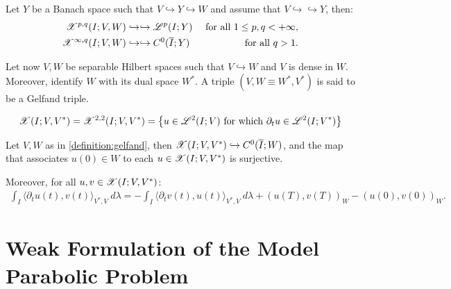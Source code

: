 \begin{theorem}
    Let $Y$ be a Banach space such that $V \hookrightarrow Y \hookrightarrow W$ and assume that $V \hookrightarrow \hookrightarrow Y$, then:
    \begin{align}
        \mathscr{X}^{p, q}(I; V, W) &\hookrightarrow \hookrightarrow \mathscr{L}^{p}(I; Y) &\text{ for all } 1 \leq p, q < +\infty,\\
        \mathscr{X}^{\infty, q}(I; V, W) &\hookrightarrow \hookrightarrow C^0(\overline{I}; Y) &\text{ for all } q > 1.
    \end{align}
\end{theorem}

\begin{definition} \label{definition:gelfand}
    Let now $V, W$ be separable Hilbert spaces such that $V \hookrightarrow W$ and $V$ is dense in $W$. Moreover, identify $W$ with its dual space $W^*$. A triple $\left( V, W \equiv W^*, V^* \right)$ is said to be a Gelfand triple.
\end{definition}

\begin{definition}[$\SpaceX(I; V, V^*)$] \label{definition:x}
    \begin{align}
        \mathscr{X}(I; V, V^*) = \mathscr{X}^{2, 2}(I; V, V^*) = \left\{ u \in \mathscr{L}^{2}(I; V) \text{ for which } \partial_t u \in \mathscr{L}^{2}(I; V^*) \right\}
    \end{align}
\end{definition}

\begin{theorem}
    Let $V, W$ as in \cref{definition:gelfand}, then \newline \nobreak $\mathscr{X}(I; V, V^*) \hookrightarrow C^0(\overline{I};W)$, and the map that associates $u(0) \in W$ to each $u \in \mathscr{X}(I; V, V^*)$ is surjective.

    Moreover, for all $u, v \in \mathscr{X}(I; V, V^*)$:
    \begin{align}
        \int_I \langle \partial_t u(t), v(t) \rangle_{V^*, V} ~ d \lambda = - \int_I \langle \partial_t v(t), u(t) \rangle_{V^*, V} ~ d \lambda + \left( u(T), v(T) \right)_W - \left( u(0), v(0) \right)_W.
    \end{align}
\end{theorem}

\newpage
\section{Weak Formulation of the Model Parabolic Problem}

